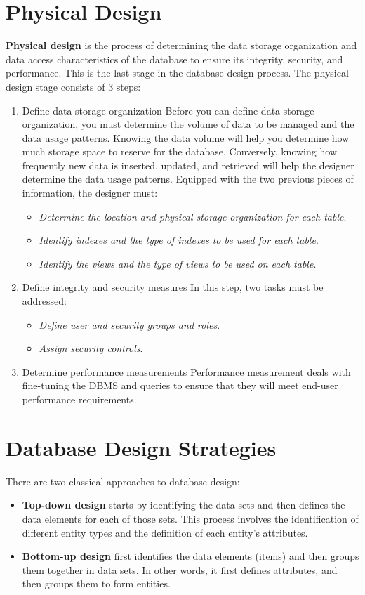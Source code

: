 \documentclass[a4paper, 12pt, titlepage]{report}
\begin{document}
\section{Physical Design}
\textbf{Physical design} is the process of determining the data storage organization and data access characteristics of the database to ensure its integrity, security, and performance. This is the last stage in the database design process. The physical design stage consists of 3 steps:
\begin{enumerate}
\item Define data storage organization
Before you can define data storage organization, you must determine the volume of data to be managed and the data usage patterns. Knowing the data volume will help you determine how much storage space to reserve for the database. Conversely, knowing how frequently new data is inserted, updated, and retrieved will help the designer determine the data usage patterns.
Equipped with the two previous pieces of information, the designer must:
\begin{itemize}
\item \emph{Determine the location and physical storage organization for each table}.
\item \emph{Identify indexes and the type of indexes to be used for each table}.
\item \emph{Identify the views and the type of views to be used on each table}.
\end{itemize}
\item Define integrity and security measures
In this step, two tasks must be addressed:
\begin{itemize}
\item \emph{Define user and security groups and roles}.
\item \emph{Assign security controls}.
\end{itemize}
\item Determine performance measurements
Performance measurement deals with fine-tuning the DBMS and queries to ensure that they will meet end-user performance requirements.
\end{enumerate}
\section{Database Design Strategies}
There are two classical approaches to database design:
\begin{itemize}
\item \textbf{Top-down design} starts by identifying the data sets and then defines the data elements for each of those sets. This process involves the identification of different entity types and the definition of each entity’s attributes.
\item \textbf{Bottom-up design} first identifies the data elements (items) and then groups them together in data sets. In other words, it first defines attributes, and then groups them to form entities.
\end{itemize}
\end{document}
